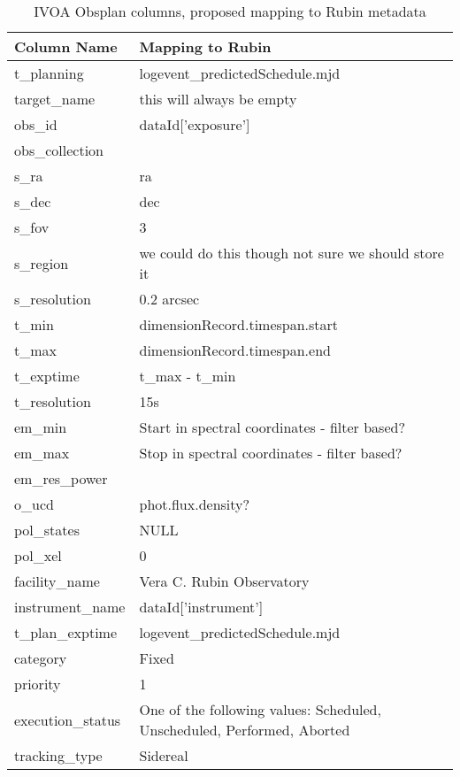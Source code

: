 
\begin{table}
\begin{tabular}{ |l|l| }
\hline
\textbf{Column Name} & \textbf{Mapping to Rubin} \\
\hline
t\_planning & logevent\_predictedSchedule.mjd \\
\hline
target\_name & this will always be empty \\
\hline
obs\_id & dataId['exposure'] \\
\hline
obs\_collection &  \\
\hline
s\_ra & ra \\
\hline
s\_dec & dec \\
\hline
s\_fov  & 3 \\
\hline
s\_region & we could do this though not sure we should store it \\
\hline
s\_resolution & 0.2 arcsec \\
\hline
t\_min & dimensionRecord.timespan.start \\
\hline
t\_max & dimensionRecord.timespan.end \\
\hline
t\_exptime & t\_max - t\_min \\
\hline
t\_resolution & 15s \\
\hline
em\_min & Start in spectral coordinates - filter based?  \\
\hline
em\_max & Stop in spectral coordinates - filter based? \\
\hline
em\_res\_power & \\
\hline
o\_ucd &  phot.flux.density? \\
\hline
pol\_states & NULL \\
\hline
pol\_xel & 0\\
\hline
facility\_name & Vera C. Rubin Observatory\\
\hline
instrument\_name &  dataId['instrument'] \\
\hline
t\_plan\_exptime & logevent\_predictedSchedule.mjd \\
\hline
category & Fixed \\
\hline
priority & 1 \\
\hline
execution\_status & One of the following values:  Scheduled, Unscheduled, Performed, Aborted \\
\hline
tracking\_type &  Sidereal \\
\hline
\end{tabular}
\caption{IVOA Obsplan columns, proposed  mapping to Rubin metadata}
\label{tab:schema}
\end{table}

